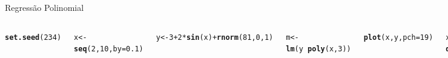 \documentclass{beamer}\usepackage[]{graphicx}\usepackage[]{color}
\makeatletter
\newcommand{\hlnum}[1]{\textcolor[rgb]{0.686,0.059,0.569}{#1}}%
\newcommand{\hlstr}[1]{\textcolor[rgb]{0.192,0.494,0.8}{#1}}%
\newcommand{\hlopt}[1]{\textcolor[rgb]{0,0,0}{#1}}%
\newcommand{\hlstd}[1]{\textcolor[rgb]{0.345,0.345,0.345}{#1}}%
\newcommand{\hlkwb}[1]{\textcolor[rgb]{0.69,0.353,0.396}{#1}}%
\newcommand{\hlkwc}[1]{\textcolor[rgb]{0.333,0.667,0.333}{#1}}%
\newcommand{\hlkwd}[1]{\textcolor[rgb]{0.737,0.353,0.396}{\textbf{#1}}}%
\newenvironment{kframe}{%
 \def\at@end@of@kframe{}%
 \ifinner\ifhmode%
  \def\at@end@of@kframe{\end{minipage}}%
  \begin{minipage}{\columnwidth}%
 \fi\fi%
 \def\FrameCommand##1{\hskip\@totalleftmargin \hskip-\fboxsep
 \colorbox{shadecolor}{##1}\hskip-\fboxsep
     \hskip-\linewidth \hskip-\@totalleftmargin \hskip\columnwidth}%
 \MakeFramed {\advance\hsize-\width
   \@totalleftmargin\z@ \linewidth\hsize
   \@setminipage}}%
 {\par\unskip\endMakeFramed%
 \at@end@of@kframe}
\newenvironment{knitrout}{}{} %
\renewenvironment{knitrout}{\setlength{\topsep}{0mm}}{}
\makeatother
\begin{document}
\begin{frame}[fragile]{Regressão Polinomial}

\begin{columns}

\setlength{\topsep}{2pt}
\begin{knitrout}\tiny
{}\color{fgcolor}\begin{kframe}
\begin{alltt}
\hlkwd{set.seed}\hlstd{(}\hlnum{234}\hlstd{)}

\hlstd{x} \hlkwb{<-} \hlkwd{seq}\hlstd{(}\hlnum{2}\hlstd{,}\hlnum{10}\hlstd{,}\hlkwc{by}\hlstd{=}\hlnum{0.1}\hlstd{)}

\hlstd{y} \hlkwb{<-} \hlnum{3} \hlopt{+} \hlnum{2}\hlopt{*}\hlkwd{sin}\hlstd{(x)} \hlopt{+} \hlkwd{rnorm}\hlstd{(}\hlnum{81}\hlstd{,}\hlnum{0}\hlstd{,}\hlnum{1}\hlstd{)}

\hlstd{m} \hlkwb{<-} \hlkwd{lm}\hlstd{(y} \hlopt{~} \hlkwd{poly}\hlstd{(x,}\hlnum{3}\hlstd{))}

\hlkwd{plot}\hlstd{(x,y,} \hlkwc{pch}\hlstd{=}\hlnum{19}\hlstd{)}

\hlstd{xnovo} \hlkwb{<-} \hlkwd{data.frame}\hlstd{(} \hlkwc{x} \hlstd{=} \hlkwd{seq}\hlstd{(}\hlnum{2}\hlstd{,}\hlnum{10}\hlstd{,}\hlkwc{by}\hlstd{=}\hlnum{0.1}\hlstd{))}

\hlstd{p} \hlkwb{<-} \hlkwd{predict}\hlstd{(m,xnovo)}

\hlkwd{lines}\hlstd{(xnovo[,}\hlnum{1}\hlstd{],p,} \hlkwc{lwd}\hlstd{=}\hlnum{2}\hlstd{,}\hlkwc{col}\hlstd{=}\hlstr{'red'}\hlstd{)}
\end{alltt}
\end{kframe}
\end{knitrout}



\end{columns}
\end{frame}
\end{document}
